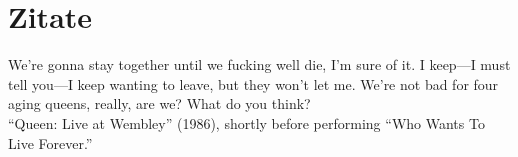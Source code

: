 \chapter{Zitate}
\label{appendix:zitate}
We’re gonna stay together until we fucking well die, I’m sure of it. I keep—I must tell you—I keep wanting to leave, but they won’t let me. We’re not bad for four aging queens, really, are we? What do you think? \\
\enquote{Queen: Live at Wembley} (1986), shortly before performing \enquote{Who Wants To Live Forever.}
        \tagmcend
\tagstructend
